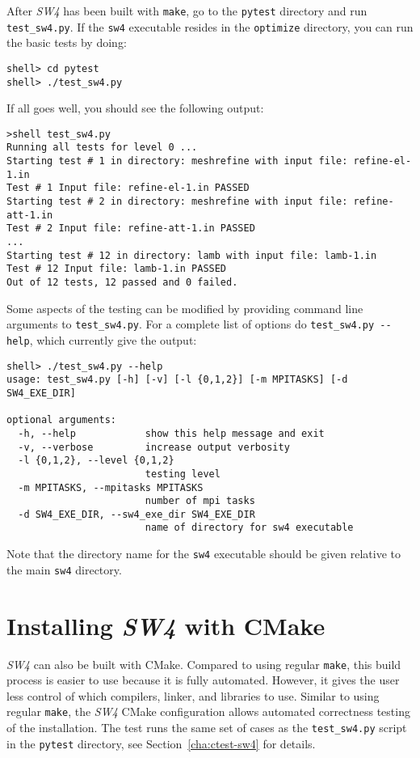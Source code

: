 \documentclass[11pt]{article}
\begin{document}
After \emph{SW4} has been built with \verb+make+, go to the \verb+pytest+ directory and run
\verb+test_sw4.py+. If the \verb+sw4+ executable resides in the \verb+optimize+ directory, you can
run the basic tests by doing:
\begin{verbatim}
shell> cd pytest
shell> ./test_sw4.py
\end{verbatim}
If all goes well, you should see the following output:
\begin{verbatim}
>shell test_sw4.py
Running all tests for level 0 ...
Starting test # 1 in directory: meshrefine with input file: refine-el-1.in
Test # 1 Input file: refine-el-1.in PASSED
Starting test # 2 in directory: meshrefine with input file: refine-att-1.in
Test # 2 Input file: refine-att-1.in PASSED
...
Starting test # 12 in directory: lamb with input file: lamb-1.in
Test # 12 Input file: lamb-1.in PASSED
Out of 12 tests, 12 passed and 0 failed.
\end{verbatim}
Some aspects of the testing can be modified by providing command line arguments to
\verb+test_sw4.py+. For a complete list of options do \verb+test_sw4.py --help+, which currently
give the output:
\begin{verbatim}
shell> ./test_sw4.py --help
usage: test_sw4.py [-h] [-v] [-l {0,1,2}] [-m MPITASKS] [-d SW4_EXE_DIR]

optional arguments:
  -h, --help            show this help message and exit
  -v, --verbose         increase output verbosity
  -l {0,1,2}, --level {0,1,2}
                        testing level
  -m MPITASKS, --mpitasks MPITASKS
                        number of mpi tasks
  -d SW4_EXE_DIR, --sw4_exe_dir SW4_EXE_DIR
                        name of directory for sw4 executable
\end{verbatim}
Note  that the directory name for the \verb+sw4+ executable should be given relative to the main
\verb+sw4+ directory.

\section{Installing \emph{SW4} with CMake}\label{cha:installing-cmake-sw4}
\emph{SW4} can also be built with CMake. Compared to using regular {\tt make}, this build process is
easier to use because it is fully automated. However, it gives the user less control of which
compilers, linker, and libraries to use. Similar to using regular {\tt make}, the \emph{SW4} CMake
configuration allows automated correctness testing of the installation. The test runs the same set
of cases as the \verb+test_sw4.py+ script in the \verb+pytest+ directory, see
Section~\ref{cha:ctest-sw4} for details.
\end{document}
